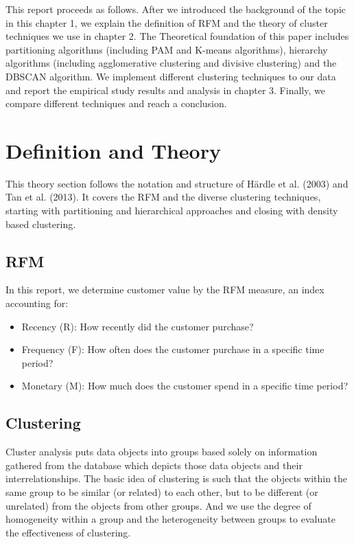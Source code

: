 \documentclass[a4paper,12pt,fleqn]{article}
\begin{document}
This report proceeds as follows. After we introduced the background of the topic in this chapter 1, we explain the definition of RFM and the theory of cluster techniques we use in chapter 2. The Theoretical foundation of this paper includes partitioning algorithms (including PAM and K-means algorithms), hierarchy algorithms (including agglomerative clustering and divisive clustering) and the DBSCAN algorithm. We implement different clustering techniques to our data and report the empirical study results and analysis in chapter 3. Finally, we compare different techniques and reach a conclusion.

\newpage
\section{Definition and Theory}
This theory section follows the notation and structure of Härdle et al. (2003) and Tan et al. (2013). It covers the RFM and the diverse clustering techniques, starting with partitioning and hierarchical approaches and closing with density based clustering.

\subsection{RFM}
In this report, we determine customer value by the RFM measure, an index accounting for:
\begin{itemize}
	\item Recency (R):\- How recently did the customer purchase?
	\item Frequency (F):\- How often does the customer purchase in a specific time period?
	\item Monetary (M):\- How much does the customer spend in a specific time period?
\end{itemize}

\subsection{Clustering}%
Cluster analysis puts data objects into groups based solely on information gathered from the database which depicts those data objects and their interrelationships. The basic idea of clustering is such that the objects within the same group to be similar (or related) to each other, but to be different (or unrelated) from the objects from other groups. And we use the degree of homogeneity within a group and the heterogeneity between groups to evaluate the effectiveness of clustering.
\end{document}
